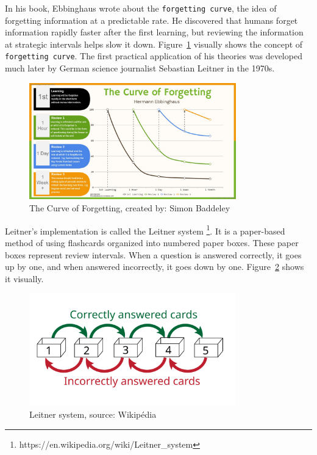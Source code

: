 In his book, Ebbinghaus wrote about the \texttt{forgetting curve}, the idea of forgetting information at a predictable rate. He discovered that humans forget information rapidly faster after the first learning, but reviewing the information at strategic intervals helps slow it down. Figure~\ref{fig:forgetting-curve} visually shows the concept of \texttt{forgetting curve}. The first practical application of his theories was developed much later by German science journalist Sebastian Leitner in the 1970s.

\begin{figure}[!h]
  \centering
  \includegraphics[width=0.8\textwidth, keepaspectratio]{figures/forgetting_curve}
  \caption{The Curve of Forgetting, created by: Simon Baddeley}
  \label{fig:forgetting-curve}
\end{figure}

Leitner's implementation is called the Leitner system \footnote{https://en.wikipedia.org/wiki/Leitner_system}. It is a paper-based method of using flashcards organized into numbered paper boxes. These paper boxes represent review intervals. When a question is answered correctly, it goes up by one, and when answered incorrectly, it goes down by one. Figure~\ref{fig:leitner-system} shows it visually.

\begin{figure}[!h]
  \centering
  \includegraphics[width=0.8\textwidth, keepaspectratio]{figures/Leitner_system}
  \caption{Leitner system, source: Wikipédia}
  \label{fig:leitner-system}
\end{figure}

